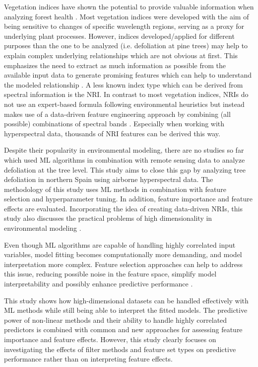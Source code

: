\documentclass[final]{IEEEtran}
\begin{document}
Vegetation indices have shown the potential to provide valuable information when analyzing forest health \cite{jiang2014, adamczyk2015}.
Most vegetation indices were developed with the aim of being sensitive to changes of specific wavelength regions, serving as a proxy for underlying plant processes.
However, indices developed/applied for different purposes than the one to be analyzed (i.e. defoliation at pine trees) may help to explain complex underlying relationships which are not obvious at first.
This emphasizes the need to extract as much information as possible from the available input data to generate promising features which can help to understand the modeled relationship \cite{thenkabail2018}.
A less known index type which can be derived from spectral information is the \ac{NRI}.
In contrast to most vegetation indices, \ac{NRI}s do not use an expert-based formula following environmental heuristics but instead makes use of a data-driven feature engineering approach by combining (all possible) combinations of spectral bands \cite{thenkabail2000}.
Especially when working with hyperspectral data, thousands of \ac{NRI} features can be derived this way.


Despite their popularity in environmental modeling, there are no studies so far which used ML algorithms in combination with remote sensing data to analyze defoliation at the tree level.
This study aims to close this gap by analyzing tree defoliation in northern Spain using airborne hyperspectral data.
The methodology of this study uses ML methods in combination with feature selection and hyperparameter tuning.
In addition, feature importance and feature effects are evaluated.
Incorporating the idea of creating data-driven \ac{NRI}s, this study also discusses the practical problems of high dimensionality in environmental modeling \cite{trunk1979, xu2016}.

Even though \ac{ML} algorithms are capable of handling highly correlated input variables, model fitting becomes computationally more demanding, and model interpretation more complex.
Feature selection approaches can help to address this issue, reducing possible noise in the feature space, simplify model interpretability and possibly enhance predictive performance \cite{cai2018}.

This study shows how high-dimensional datasets can be handled effectively with ML methods while still being able to interpret the fitted models.
The predictive power of non-linear methods and their ability to handle highly correlated predictors is combined with common and new approaches for assessing feature importance and feature effects.
However, this study clearly focuses on investigating the effects of filter methods and feature set types on predictive performance rather than on interpreting feature effects.
\end{document}
